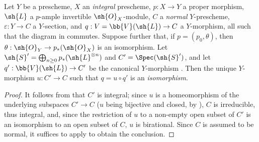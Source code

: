 \begin{proposition}[8.11.7]
\label{II.8.11.7}
Let $Y$ be a prescheme, $X$ an \emph{integral} prescheme, $p:X\to Y$ a proper morphism, $\sh{L}$ a $p$-ample invertible $\sh{O}_X$-module, $C$ a \emph{normal} $Y$-prescheme, $\varepsilon:Y\to C$ a $Y$-section, and $q:V=\bb{V}(\sh{L})\to C$ a $Y$-morphism, all such that the diagram in  commutes.
Suppose further that, if $p=(p_0,\theta)$, then $\theta:\sh{O}_Y\to p_*(\sh{O}_X)$ is an isomorphism.
Let $\sh{S}'=\bigoplus_{n\geq0}p_*(\sh{L}^{\otimes n})$ and $C'=\Spec(\sh{S}')$, and let $q':\bb{V}(\sh{L})\to C'$ be the canonical $Y$-morphism .
Then the unique $Y$-morphism $u:C'\to C$ such that $q=u\circ q'$ is an \emph{isomorphism}.
\end{proposition}

\begin{proof}
It follows from  that $C'$ is integral;
since $u$ is a homeomorphism of the underlying subspaces $C'\to C$ ($u$ being bijective and closed, by ), $C$ is irreducible, thus integral, and, since the restriction of $u$ to a non-empty open subset of $C'$ is an isomorphism to an open subset of $C$, $u$ is birational.
Since $C$ is assumed to be normal, it suffices to apply  to obtain the conclusion.
\end{proof}

